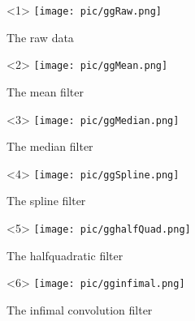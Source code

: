 \documentclass[comptress]{beamer}
\begin{document}
\begin{frame}

  \begin{onlyenv}<1>
    \texttt{[image: pic/ggRaw.png]}

    \begin{center}
      The raw data
    \end{center}
  \end{onlyenv}
  \begin{onlyenv}<2>
    \texttt{[image: pic/ggMean.png]}

    \begin{center}
      The mean filter
    \end{center}
  \end{onlyenv}

  \begin{onlyenv}<3>
    \texttt{[image: pic/ggMedian.png]}

    \begin{center}
      The median filter
    \end{center}
  \end{onlyenv}
    \begin{onlyenv}<4>
      \texttt{[image: pic/ggSpline.png]}

      \begin{center}
        The spline filter
      \end{center}
  \end{onlyenv}
    \begin{onlyenv}<5>
      \texttt{[image: pic/gghalfQuad.png]}

          \begin{center}
      The halfquadratic filter
    \end{center}
  \end{onlyenv}
    \begin{onlyenv}<6>
      \texttt{[image: pic/gginfimal.png]}

      \begin{center}
      The infimal convolution filter
    \end{center}
  \end{onlyenv}


\end{frame}



\end{document}
